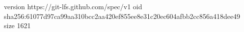 version https://git-lfs.github.com/spec/v1
oid sha256:61077d97ca99aa310bcc2aa420ef855ee8e31c20ec604afbb2cc856a418dee49
size 1621
